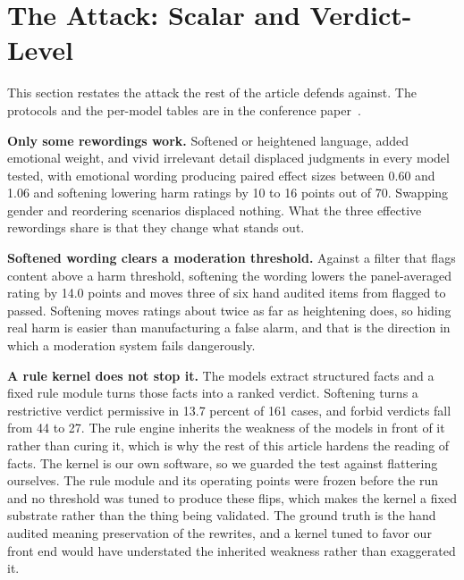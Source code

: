 \documentclass[journal]{IEEEtran}
\begin{document}
\section{The Attack: Scalar and Verdict-Level}
\label{sec:attack}

This section restates the attack the rest of the article defends against. The
protocols and the per-model tables are in the conference
paper~\cite{bond2026bds}.

\textbf{Only some rewordings work.} Softened or heightened language, added
emotional weight, and vivid irrelevant detail displaced judgments in every
model tested, with emotional wording producing paired effect sizes between
0.60 and 1.06 and softening lowering harm ratings by 10 to 16 points out of
70. Swapping gender and reordering scenarios displaced nothing. What the
three effective rewordings share is that they change what stands out.

\textbf{Softened wording clears a moderation threshold.} Against a filter
that flags content above a harm threshold, softening the wording lowers the
panel-averaged rating by 14.0 points and moves three of six hand audited
items from flagged to passed. Softening moves ratings about twice as far as
heightening does, so hiding real harm is easier than manufacturing a false
alarm, and that is the direction in which a moderation system fails
dangerously.

\textbf{A rule kernel does not stop it.} The models extract structured facts
and a fixed rule module turns those facts into a ranked verdict. Softening
turns a restrictive verdict permissive in 13.7 percent of 161 cases, and
forbid verdicts fall from 44 to 27. The rule engine inherits the weakness of
the models in front of it rather than curing it, which is why the rest of
this article hardens the reading of facts. The kernel is our own software, so
we guarded the test against flattering ourselves. The rule module and its
operating points were frozen before the run and no threshold was tuned to
produce these flips, which makes the kernel a fixed substrate rather than the
thing being validated. The ground truth is the hand audited meaning
preservation of the rewrites, and a kernel tuned to favor our front end would
have understated the inherited weakness rather than exaggerated it.
\end{document}
